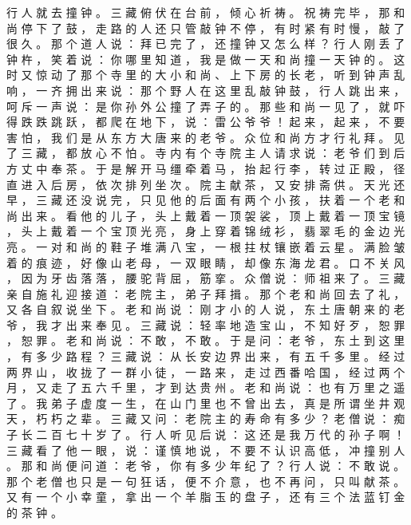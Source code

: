 {行 人 就 去 撞 钟 。
三 藏 俯 伏 在 台 前 ， 倾 心 祈 祷 。
祝 祷 完 毕 ， 那 和 尚 停 下 了 鼓 ， 走 路 的 人 还 只 管 敲 钟 不 停 ， 有 时 紧 有 时 慢 ， 敲 了 很 久 。
那 个 道 人 说 ： 拜 已 完 了 ， 还 撞 钟 又 怎 么 样 ？ 行 人 刚 丢 了 钟 杵 ， 笑 着 说 ： 你 哪 里 知 道 ， 我 是 做 一 天 和 尚 撞 一 天 钟 的 。
这 时 又 惊 动 了 那 个 寺 里 的 大 小 和 尚 、 上 下 房 的 长 老 ， 听 到 钟 声 乱 响 ， 一 齐 拥 出 来 说 ： 那 个 野 人 在 这 里 乱 敲 钟 鼓 ， 行 人 跳 出 来 ， 呵 斥 一 声 说 ： 是 你 孙 外 公 撞 了 弄 子 的 。
那 些 和 尚 一 见 了 ， 就 吓 得 跌 跌 跳 跃 ， 都 爬 在 地 下 ， 说 ： 雷 公 爷 爷 ！
起 来 ， 起 来 ， 不 要 害 怕 ， 我 们 是 从 东 方 大 唐 来 的 老 爷 。
众 位 和 尚 方 才 行 礼 拜 。
见 了 三 藏 ， 都 放 心 不 怕 。
寺 内 有 个 寺 院 主 人 请 求 说 ： 老 爷 们 到 后 方 丈 中 奉 茶 。
于 是 解 开 马 缰 牵 着 马 ， 抬 起 行 李 ， 转 过 正 殿 ， 径 直 进 入 后 房 ， 依 次 排 列 坐 次 。
院 主 献 茶 ， 又 安 排 斋 供 。
天 光 还 早 ， 三 藏 还 没 说 完 ， 只 见 他 的 后 面 有 两 个 小 孩 ， 扶 着 一 个 老 和 尚 出 来 。
看 他 的 儿 子 ， 头 上 戴 着 一 顶 袈 裟 ， 顶 上 戴 着 一 顶 宝 镜 ， 头 上 戴 着 一 个 宝 顶 光 亮 ， 身 上 穿 着 锦 绒 衫 ， 翡 翠 毛 的 金 边 光 亮 。
一 对 和 尚 的 鞋 子 堆 满 八 宝 ， 一 根 拄 杖 镶 嵌 着 云 星 。
满 脸 皱 着 的 痕 迹 ， 好 像 山 老 母 ， 一 双 眼 睛 ， 却 像 东 海 龙 君 。
口 不 关 风 ， 因 为 牙 齿 落 落 ， 腰 驼 背 屈 ， 筋 挛 。
众 僧 说 ： 师 祖 来 了 。
三 藏 亲 自 施 礼 迎 接 道 ： 老 院 主 ， 弟 子 拜 揖 。
那 个 老 和 尚 回 去 了 礼 ， 又 各 自 叙 说 坐 下 。
老 和 尚 说 ： 刚 才 小 的 人 说 ， 东 土 唐 朝 来 的 老 爷 ， 我 才 出 来 奉 见 。
三 藏 说 ： 轻 率 地 造 宝 山 ， 不 知 好 歹 ， 恕 罪 ， 恕 罪 。
老 和 尚 说 ： 不 敢 ， 不 敢 。
于 是 问 ： 老 爷 ， 东 土 到 这 里 ， 有 多 少 路 程 ？ 三 藏 说 ： 从 长 安 边 界 出 来 ， 有 五 千 多 里 。
经 过 两 界 山 ， 收 拢 了 一 群 小 徒 ， 一 路 来 ， 走 过 西 番 哈 国 ， 经 过 两 个 月 ， 又 走 了 五 六 千 里 ， 才 到 达 贵 州 。
老 和 尚 说 ： 也 有 万 里 之 遥 了 。
我 弟 子 虚 度 一 生 ， 在 山 门 里 也 不 曾 出 去 ， 真 是 所 谓 坐 井 观 天 ， 朽 朽 之 辈 。
三 藏 又 问 ： 老 院 主 的 寿 命 有 多 少 ？ 老 僧 说 ： 痴 子 长 二 百 七 十 岁 了 。
行 人 听 见 后 说 ： 这 还 是 我 万 代 的 孙 子 啊 ！
三 藏 看 了 他 一 眼 ， 说 ： 谨 慎 地 说 ， 不 要 不 认 识 高 低 ， 冲 撞 别 人 。
那 和 尚 便 问 道 ： 老 爷 ， 你 有 多 少 年 纪 了 ？ 行 人 说 ： 不 敢 说 。
那 个 老 僧 也 只 是 一 句 狂 话 ， 便 不 介 意 ， 也 不 再 问 ， 只 叫 献 茶 。
又 有 一 个 小 幸 童 ， 拿 出 一 个 羊 脂 玉 的 盘 子 ， 还 有 三 个 法 蓝 钉 金 的 茶 钟 。
}
